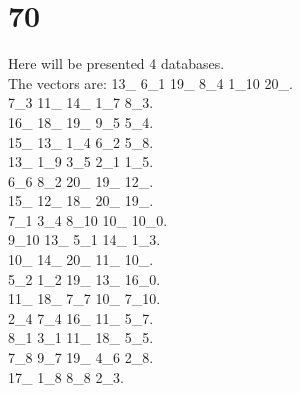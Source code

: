 \chapter{70}
\indent Here will be presented 4 databases.\\
The vectors are:
13\_ 6\_1 19\_ 8\_4 1\_10 20\_.\\7\_3 11\_ 14\_ 1\_7 8\_3.\\16\_ 18\_ 19\_ 9\_5 5\_4.\\15\_ 13\_ 1\_4 6\_2 5\_8.\\13\_ 1\_9 3\_5 2\_1 1\_5.\\6\_6 8\_2 20\_ 19\_ 12\_.\\15\_ 12\_ 18\_ 20\_ 19\_.\\7\_1 3\_4 8\_10 10\_ 10\_0.\\9\_10 13\_ 5\_1 14\_ 1\_3.\\10\_ 14\_ 20\_ 11\_ 10\_.\\5\_2 1\_2 19\_ 13\_ 16\_0.\\11\_ 18\_ 7\_7 10\_ 7\_10.\\2\_4 7\_4 16\_ 11\_ 5\_7.\\8\_1 3\_1 11\_ 18\_ 5\_5.\\7\_8 9\_7 19\_ 4\_6 2\_8.\\17\_ 1\_8 8\_8 2\_3.\\